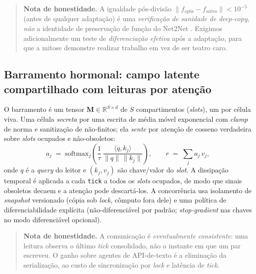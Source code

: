 \documentclass[11pt]{article}
\newcommand{\R}{\mathbb{R}}
\begin{document}
\begin{quotation}
\noindent\textbf{Nota de honestidade.} A igualdade pós-divisão
$\lVert f_{\text{após}}-f_{\text{antes}}\rVert<10^{-5}$ (antes de qualquer
adaptação) é uma \emph{verificação de sanidade de deep-copy}, \emph{não} a
identidade de preservação de função do Net2Net \cite{chen2016net2net}. Exigimos
adicionalmente um teste de \emph{diferenciação efetiva} após a adaptação, para que
a mitose demonstre realizar trabalho em vez de ser teatro caro.
\end{quotation}

\subsection{Barramento hormonal: campo latente compartilhado com leituras por atenção}
O barramento é um tensor $\mathbf{M}\in\R^{S\times d}$ de $S$ compartimentos
(\emph{slots}), um por célula viva. Uma célula \emph{secreta} por uma escrita de
média móvel exponencial com \emph{clamp} de norma e sanitização de não-finitos;
ela \emph{sente} por atenção de cosseno verdadeira sobre \emph{slots} ocupados e
não-obsoletos:
\begin{equation}
a_j \;=\; \mathrm{softmax}_j\!\left(\frac{1}{\tau}\,
\frac{\langle q, k_j\rangle}{\lVert q\rVert\,\lVert k_j\rVert}\right),
\qquad
r \;=\; \sum_{j} a_j\, v_j,
\label{eq:attn}
\end{equation}
onde $q$ é a \emph{query} do leitor e $(k_j,v_j)$ são chave/valor do \emph{slot}.
A dissipação temporal é aplicada a cada \texttt{tick} a todos os \emph{slots}
ocupados, de modo que sinais obsoletos decaem e a atenção pode descartá-los. A
concorrência usa isolamento de \emph{snapshot} versionado (cópia sob \emph{lock},
cômputo fora dele) e uma política de diferenciabilidade explícita
(não-diferenciável por padrão; \emph{stop-gradient} nas chaves no modo
diferenciável opcional).

\begin{quotation}
\noindent\textbf{Nota de honestidade.} A comunicação é \emph{eventualmente
consistente}: uma leitura observa o último \emph{tick} consolidado, não o instante
em que um par escreveu. O ganho sobre agentes de API-de-texto é a eliminação da
serialização, ao custo de sincronização por \emph{lock} e latência de \emph{tick}.
\end{quotation}
\end{document}
